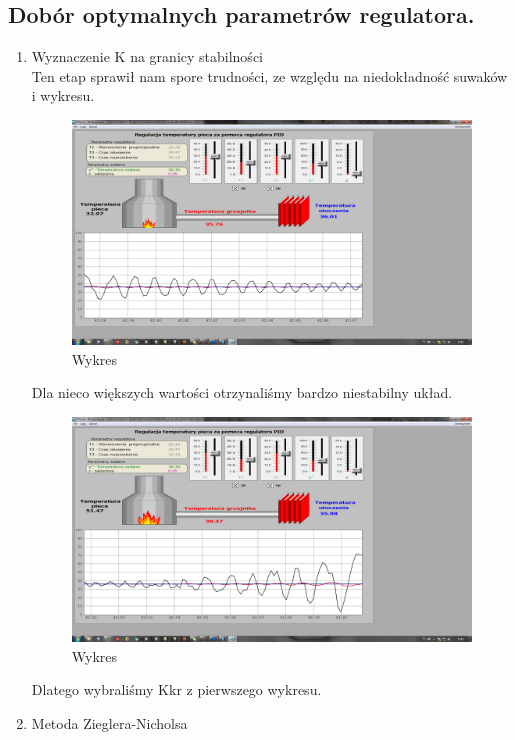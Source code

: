 \documentclass[a4paper,10pt]{article}
\begin{document}
\subsection{Dobór optymalnych parametrów regulatora.}\label{sec:zad2}
\begin{enumerate}
	\item Wyznaczenie K na granicy stabilności\\
		Ten etap sprawił nam spore trudności, ze względu na niedokładność suwaków i wykresu.
		\begin{figure}[!h]
		    \centering
			\includegraphics[width=120mm]{CW6-T130-(Kkr)-T220-T330.png}
			\caption{Wykres}
		    \label{fig:Rysunek}
		\end{figure}
		Dla nieco większych wartości otrzynaliśmy bardzo niestabilny układ.
		\begin{figure}[!h]
		    \centering
			\includegraphics[width=120mm]{CW6-T130+(Kkr)-T220-T330.png}
			\caption{Wykres}
		    \label{fig:Rysunek}
		\end{figure}
		Dlatego wybraliśmy Kkr z pierwszego wykresu.\newpage
	\item Metoda Zieglera-Nicholsa	


\end{enumerate}
\end{document}

